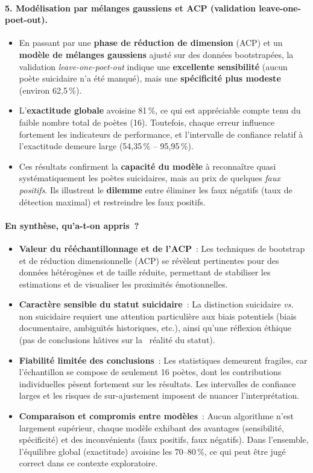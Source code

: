 \paragraph{5. Modélisation par mélanges gaussiens et ACP (validation leave-one-poet-out).}
\begin{itemize}
	\item En passant par une \textbf{phase de réduction de dimension} (ACP) et un \textbf{modèle de mélanges gaussiens} ajusté sur des données bootstrapées, la validation \emph{leave-one-poet-out} indique une \textbf{excellente sensibilité} (aucun poète suicidaire n’a été manqué), mais une \textbf{spécificité plus modeste} (environ 62,5\,\%).  
	\item L’\textbf{exactitude globale} avoisine 81\,\%, ce qui est appréciable compte tenu du faible nombre total de poètes (16). Toutefois, chaque erreur influence fortement les indicateurs de performance, et l’intervalle de confiance relatif à l’exactitude demeure large (54,35\,\% -- 95,95\,\%).  
	\item Ces résultats confirment la \textbf{capacité du modèle} à reconnaître quasi systématiquement les poètes suicidaires, mais au prix de quelques \emph{faux positifs}. Ils illustrent le \textbf{dilemme} entre éliminer les faux négatifs (taux de détection maximal) et restreindre les faux positifs.
\end{itemize}

\paragraph{En synthèse, qu’a-t-on appris~?}
\begin{itemize}
	\item \textbf{Valeur du rééchantillonnage et de l’ACP}~: Les techniques de bootstrap et de réduction dimensionnelle (ACP) se révèlent pertinentes pour des données hétérogènes et de taille réduite, permettant de stabiliser les estimations et de visualiser les proximités émotionnelles.  
	\item \textbf{Caractère sensible du statut suicidaire}~: La distinction suicidaire \emph{vs.} non suicidaire requiert une attention particulière aux biais potentiels (biais documentaire, ambiguïtés historiques, etc.), ainsi qu’une réflexion éthique (pas de conclusions hâtives sur la \og\, réalité \fg{} du statut).  
	\item \textbf{Fiabilité limitée des conclusions}~: Les statistiques demeurent fragiles, car l’échantillon se compose de seulement 16 poètes, dont les contributions individuelles pèsent fortement sur les résultats. Les intervalles de confiance larges et les risques de sur-ajustement imposent de nuancer l’interprétation.  
	\item \textbf{Comparaison et compromis entre modèles}~: Aucun algorithme n’est largement supérieur, chaque modèle exhibant des avantages (sensibilité, spécificité) et des inconvénients (faux positifs, faux négatifs). Dans l’ensemble, l’équilibre global (exactitude) avoisine les 70--80\,\%, ce qui peut être jugé correct dans ce contexte exploratoire.
\end{itemize}
